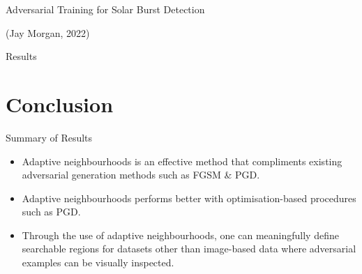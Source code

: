 \documentclass[smaller]{beamer}
\begin{document}
\begin{frame}[label={sec:org440f028}]{Adversarial Training for Solar Burst Detection}
\begin{figure}[t]
\centering
\resizebox{0.55\textwidth}{!}{}
\label{fig:adv_example}
\end{figure}
(Jay Morgan, 2022)
\end{frame}

\begin{frame}[label={sec:org970ca5d}]{Results}
\begin{table}
\caption{\label{tab:adv_fscore}$F_1$ score performance on the WAVES dataset using Faster R-CNN. Numbers highlighted in a bold font face indicate the best achieving adversarial attack for each form of defence.}
\centering
\begin{adjustbox}{center}
\end{adjustbox}
\end{table}
\end{frame}

\section{Conclusion}
\label{sec:orgb2d45bc}

\begin{frame}[label={sec:org19a0ac2}]{Summary of Results}
\begin{itemize}
\item Adaptive neighbourhoods is an effective method that compliments existing
adversarial generation methods such as FGSM \& PGD.
\item Adaptive neighbourhoods performs better with optimisation-based procedures such as
PGD.
\item Through the use of adaptive neighbourhoods, one can meaningfully define searchable
regions for datasets other than image-based data where adversarial examples can be
visually inspected.
\end{itemize}
\end{frame}
\end{document}
